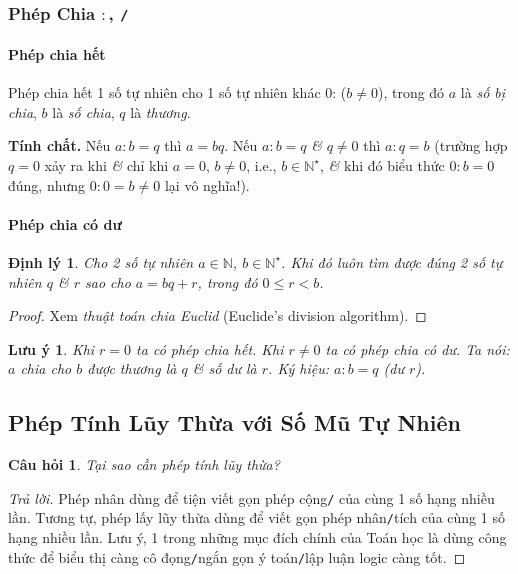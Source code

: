 \documentclass{article}
\numberwithin{equation}{section}
\newtheorem{cauhoi}{Câu hỏi}[section]
\newtheorem{luuy}{Lưu ý}[section]
\newtheorem{dinhly}{Định lý}[section]
\begin{document}
\subsubsection{Phép Chia $:$, \texttt{/}}

\paragraph{Phép chia hết}
Phép chia hết 1 số tự nhiên cho 1 số tự nhiên khác 0:  ($b\ne 0$), trong đó $a$ là \textit{số bị chia}, $b$ là \textit{số chia}, $q$ là \textit{thương}.

\noindent\textbf{Tính chất.} Nếu $a:b = q$ thì $a = bq$. Nếu $a:b = q$ \textit{\&} $q\ne 0$ thì $a:q = b$ (trường hợp $q = 0$ xảy ra khi \textit{\&} chỉ khi $a = 0$, $b\ne 0$, i.e., $b\in\mathbb{N}^\star$, \textit{\&} khi đó biểu thức $0:b = 0$ đúng, nhưng $0:0 = b\ne 0$ lại vô nghĩa!).

\paragraph{Phép chia có dư}
\begin{dinhly}
	Cho 2 số tự nhiên $a\in\mathbb{N}$, $b\in\mathbb{N}^\star$. Khi đó luôn tìm được đúng 2 số tự nhiên $q$ \textit{\&} $r$ sao cho $a = bq + r$, trong đó $0\le r < b$.
\end{dinhly}

\begin{proof}[Proof]
	Xem \textit{thuật toán chia Euclid} (Euclide's division algorithm).
\end{proof}

\begin{luuy}
	Khi $r = 0$ ta có phép chia hết. Khi $r\ne 0$ ta có phép chia có dư. Ta nói: $a$ chia cho $b$ được thương là $q$ \textit{\&} số dư là $r$. Ký hiệu: $a:b = q$ (dư $r$).
\end{luuy}


\subsection{Phép Tính Lũy Thừa với Số Mũ Tự Nhiên}

\begin{cauhoi}
	Tại sao cần phép tính lũy thừa?
\end{cauhoi}

\begin{proof}[Trả lời]
	Phép nhân dùng để tiện viết gọn phép cộng\texttt{/} của cùng 1 số hạng nhiều lần. Tương tự, phép lấy lũy thừa dùng để viết gọn phép nhân\texttt{/}tích của cùng 1 số hạng nhiều lần. Lưu ý, 1 trong những mục đích chính của Toán học là dùng công thức để biểu thị càng cô đọng\texttt{/}ngắn gọn ý toán\texttt{/}lập luận logic càng tốt.
\end{proof}
\end{document}
